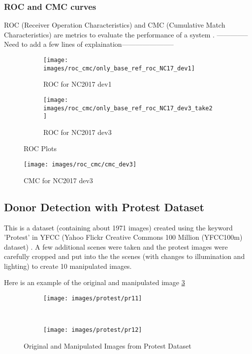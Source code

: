 \documentclass{article}
\begin{document}
\subsubsection{ROC and CMC curves}
ROC (Receiver Operation Characteristics) and CMC (Cumulative Match Characteristics) are metrics to evaluate the performance of a system \cite{RC_lec}.
--------------Need to add a few lines of explaination-----------------------
\begin{figure}[H]
  \centering
  \begin{subfigure}[H]{1.0\linewidth}
    \centering
    \texttt{[image: images/roc\_cmc/only\_base\_ref\_roc\_NC17\_dev1]}
    \caption{ROC for NC2017 dev1}
  \end{subfigure}
  \begin{subfigure}[H]{1.0\linewidth}
    \centering
    \texttt{[image: images/roc\_cmc/only\_base\_ref\_roc\_NC17\_dev3\_take2]}
    \caption{ROC for NC2017 dev3}
  \end{subfigure}
  \caption{ROC Plots}
  \label{fig:roc1}
\end{figure}

\begin{figure}[H]
  \centering
  \texttt{[image: images/roc\_cmc/cmc\_dev3]}
  \caption{CMC for NC2017 dev3}
  \label{fig:cmc1}
\end{figure}

\subsection{Donor Detection with Protest Dataset}
This is a dataset (containing about 1971 images) created using the keyword 'Protest' in YFCC (Yahoo Flickr Creative Commons 100 Million (YFCC100m) dataset) \cite{DBLP:journals/corr/ThomeeSFENPBL15}. A few additional scenes were taken and the protest images were carefully cropped and put into the the scenes (with changes to illumination and lighting) to create 10 manipulated images.

Here is an example of the original and manipulated image \ref{fig:pr_imgs}
\begin{figure}[H]
  \centering
  \begin{subfigure}[H]{0.4\linewidth}
    \texttt{[image: images/protest/pr11]}
  \end{subfigure}
  ~
  \begin{subfigure}[H]{0.4\linewidth}
    \texttt{[image: images/protest/pr12]}
  \end{subfigure}
  \caption{Original and Manipulated Images from Protest Dataset}
  \label{fig:pr_imgs}
\end{figure}
\end{document}
